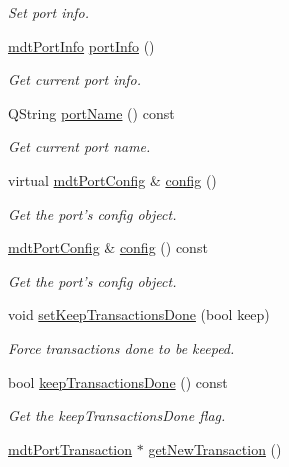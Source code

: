 \begin{DoxyCompactItemize}
\begin{DoxyCompactList}\small\item\em Set port info. \end{DoxyCompactList}\item 
\hyperlink{classmdt_port_info}{mdt\-Port\-Info} \hyperlink{classmdt_port_manager_a88109b455fc5a5f5adf0636f7450143e}{port\-Info} ()
\begin{DoxyCompactList}\small\item\em Get current port info. \end{DoxyCompactList}\item 
Q\-String \hyperlink{classmdt_port_manager_af4fcab6aaad98d74aeabfc972da1d406}{port\-Name} () const 
\begin{DoxyCompactList}\small\item\em Get current port name. \end{DoxyCompactList}\item 
virtual \hyperlink{classmdt_port_config}{mdt\-Port\-Config} \& \hyperlink{classmdt_port_manager_a9cf3ea2da38f81682695b37448712ffd}{config} ()
\begin{DoxyCompactList}\small\item\em Get the port's config object. \end{DoxyCompactList}\item 
\hyperlink{classmdt_port_config}{mdt\-Port\-Config} \& \hyperlink{classmdt_port_manager_a735b7dc766fc2f45fb2cf9772c4201b0}{config} () const 
\begin{DoxyCompactList}\small\item\em Get the port's config object. \end{DoxyCompactList}\item 
void \hyperlink{classmdt_port_manager_a9adb5098766c9df588bc9978b00c5eb2}{set\-Keep\-Transactions\-Done} (bool keep)
\begin{DoxyCompactList}\small\item\em Force transactions done to be keeped. \end{DoxyCompactList}\item 
bool \hyperlink{classmdt_port_manager_a798ce0939234870ae3b9995108e54380}{keep\-Transactions\-Done} () const 
\begin{DoxyCompactList}\small\item\em Get the keep\-Transactions\-Done flag. \end{DoxyCompactList}\item 
\hyperlink{classmdt_port_transaction}{mdt\-Port\-Transaction} $\ast$ \hyperlink{classmdt_port_manager_a75ebd3d1859e3ed38b9558981e53aac4}{get\-New\-Transaction} ()

\end{DoxyCompactItemize}
